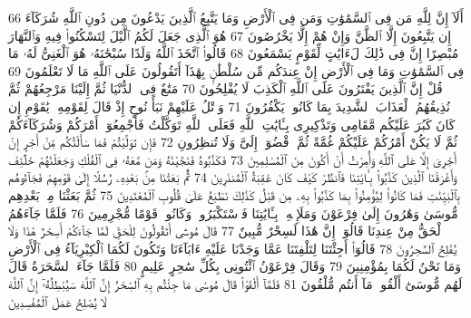 {\tiny\colorbox{cl_aya}{66}} أَلَآ إِنَّ لِلَّهِ مَن فِى ٱلسَّمَٰوَٰتِ وَمَن فِى ٱلْأَرْضِ وَمَا يَتَّبِعُ ٱلَّذِينَ يَدْعُونَ مِن دُونِ ٱللَّهِ شُرَكَآءَ إِن يَتَّبِعُونَ إِلَّا ٱلظَّنَّ وَإِنْ هُمْ إِلَّا يَخْرُصُونَ
{\tiny\colorbox{cl_aya}{67}} هُوَ ٱلَّذِى جَعَلَ لَكُمُ ٱلَّيْلَ لِتَسْكُنُوا۟ فِيهِ وَٱلنَّهَارَ مُبْصِرًا إِنَّ فِى ذَٰلِكَ لَءَايَٰتٍ لِّقَوْمٍ يَسْمَعُونَ
{\tiny\colorbox{cl_aya}{68}} قَالُوا۟ ٱتَّخَذَ ٱللَّهُ وَلَدًا سُبْحَٰنَهُۥ هُوَ ٱلْغَنِىُّ لَهُۥ مَا فِى ٱلسَّمَٰوَٰتِ وَمَا فِى ٱلْأَرْضِ إِنْ عِندَكُم مِّن سُلْطَٰنٍۭ بِهَٰذَآ أَتَقُولُونَ عَلَى ٱللَّهِ مَا لَا تَعْلَمُونَ
{\tiny\colorbox{cl_aya}{69}} قُلْ إِنَّ ٱلَّذِينَ يَفْتَرُونَ عَلَى ٱللَّهِ ٱلْكَذِبَ لَا يُفْلِحُونَ
{\tiny\colorbox{cl_aya}{70}} مَتَٰعٌ فِى ٱلدُّنْيَا ثُمَّ إِلَيْنَا مَرْجِعُهُمْ ثُمَّ نُذِيقُهُمُ ٱلْعَذَابَ ٱلشَّدِيدَ بِمَا كَانُوا۟ يَكْفُرُونَ
{\tiny\colorbox{cl_aya}{71}} وَٱتْلُ عَلَيْهِمْ نَبَأَ نُوحٍ إِذْ قَالَ لِقَوْمِهِۦ يَٰقَوْمِ إِن كَانَ كَبُرَ عَلَيْكُم مَّقَامِى وَتَذْكِيرِى بِـَٔايَٰتِ ٱللَّهِ فَعَلَى ٱللَّهِ تَوَكَّلْتُ فَأَجْمِعُوٓا۟ أَمْرَكُمْ وَشُرَكَآءَكُمْ ثُمَّ لَا يَكُنْ أَمْرُكُمْ عَلَيْكُمْ غُمَّةً ثُمَّ ٱقْضُوٓا۟ إِلَىَّ وَلَا تُنظِرُونِ
{\tiny\colorbox{cl_aya}{72}} فَإِن تَوَلَّيْتُمْ فَمَا سَأَلْتُكُم مِّنْ أَجْرٍ إِنْ أَجْرِىَ إِلَّا عَلَى ٱللَّهِ وَأُمِرْتُ أَنْ أَكُونَ مِنَ ٱلْمُسْلِمِينَ
{\tiny\colorbox{cl_aya}{73}} فَكَذَّبُوهُ فَنَجَّيْنَٰهُ وَمَن مَّعَهُۥ فِى ٱلْفُلْكِ وَجَعَلْنَٰهُمْ خَلَٰٓئِفَ وَأَغْرَقْنَا ٱلَّذِينَ كَذَّبُوا۟ بِـَٔايَٰتِنَا فَٱنظُرْ كَيْفَ كَانَ عَٰقِبَةُ ٱلْمُنذَرِينَ
{\tiny\colorbox{cl_aya}{74}} ثُمَّ بَعَثْنَا مِنۢ بَعْدِهِۦ رُسُلًا إِلَىٰ قَوْمِهِمْ فَجَآءُوهُم بِٱلْبَيِّنَٰتِ فَمَا كَانُوا۟ لِيُؤْمِنُوا۟ بِمَا كَذَّبُوا۟ بِهِۦ مِن قَبْلُ كَذَٰلِكَ نَطْبَعُ عَلَىٰ قُلُوبِ ٱلْمُعْتَدِينَ
{\tiny\colorbox{cl_aya}{75}} ثُمَّ بَعَثْنَا مِنۢ بَعْدِهِم مُّوسَىٰ وَهَٰرُونَ إِلَىٰ فِرْعَوْنَ وَمَلَإِي۟هِۦ بِـَٔايَٰتِنَا فَٱسْتَكْبَرُوا۟ وَكَانُوا۟ قَوْمًا مُّجْرِمِينَ
{\tiny\colorbox{cl_aya}{76}} فَلَمَّا جَآءَهُمُ ٱلْحَقُّ مِنْ عِندِنَا قَالُوٓا۟ إِنَّ هَٰذَا لَسِحْرٌ مُّبِينٌ
{\tiny\colorbox{cl_aya}{77}} قَالَ مُوسَىٰٓ أَتَقُولُونَ لِلْحَقِّ لَمَّا جَآءَكُمْ أَسِحْرٌ هَٰذَا وَلَا يُفْلِحُ ٱلسَّٰحِرُونَ
{\tiny\colorbox{cl_aya}{78}} قَالُوٓا۟ أَجِئْتَنَا لِتَلْفِتَنَا عَمَّا وَجَدْنَا عَلَيْهِ ءَابَآءَنَا وَتَكُونَ لَكُمَا ٱلْكِبْرِيَآءُ فِى ٱلْأَرْضِ وَمَا نَحْنُ لَكُمَا بِمُؤْمِنِينَ
{\tiny\colorbox{cl_aya}{79}} وَقَالَ فِرْعَوْنُ ٱئْتُونِى بِكُلِّ سَٰحِرٍ عَلِيمٍ
{\tiny\colorbox{cl_aya}{80}} فَلَمَّا جَآءَ ٱلسَّحَرَةُ قَالَ لَهُم مُّوسَىٰٓ أَلْقُوا۟ مَآ أَنتُم مُّلْقُونَ
{\tiny\colorbox{cl_aya}{81}} فَلَمَّآ أَلْقَوْا۟ قَالَ مُوسَىٰ مَا جِئْتُم بِهِ ٱلسِّحْرُ إِنَّ ٱللَّهَ سَيُبْطِلُهُۥٓ إِنَّ ٱللَّهَ لَا يُصْلِحُ عَمَلَ ٱلْمُفْسِدِينَ
